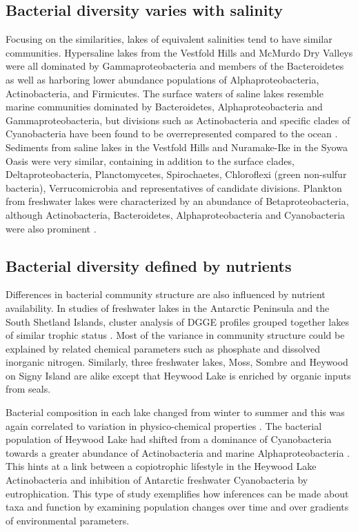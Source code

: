 \documentclass{book}
\begin{document}
\subsection{Bacterial diversity varies with salinity}
Focusing on the similarities, lakes of equivalent salinities tend to have similar communities.
Hypersaline lakes from the Vestfold Hills \cite{Bowman2000b} and McMurdo Dry Valleys \cite{Glatz2006, Mosier2007} were all dominated by Gammaproteobacteria and members of the Bacteroidetes
 as well as harboring lower abundance populations of Alphaproteobacteria, Actinobacteria, and Firmicutes.
The surface waters of saline lakes resemble marine communities dominated by Bacteroidetes, Alphaproteobacteria and Gammaproteobacteria,
 but divisions such as Actinobacteria and specific clades of Cyanobacteria have been found to be overrepresented compared to the ocean \cite{Lauro2011}.
Sediments from saline lakes in the Vestfold Hills \cite{Bowman2000a} and Nuramake-Ike in the Syowa Oasis \cite{Kurasawa2010} were very similar, 
containing in addition to the surface clades, Deltaproteobacteria, Planctomycetes, Spirochaetes, Chloroflexi (green non-sulfur bacteria), Verrucomicrobia and representatives of candidate divisions.
Plankton from freshwater lakes were characterized by an abundance of Betaproteobacteria, 
although Actinobacteria, Bacteroidetes, Alphaproteobacteria and Cyanobacteria were also prominent \cite{Pearce2003, Pearce2005, Pearce2005, Schiaffino2009}. 

\subsection{Bacterial diversity defined by nutrients}
Differences in bacterial community structure are also influenced by nutrient availability.
In studies of freshwater lakes in the Antarctic Peninsula and the South Shetland Islands, cluster analysis of DGGE profiles grouped together lakes of similar trophic status 
\cite{Schiaffino2009, Villaescusa2010}.
Most of the variance in community structure could be explained by related chemical parameters such as phosphate and dissolved inorganic nitrogen.
Similarly, three freshwater lakes, Moss, Sombre and Heywood on Signy Island are alike except that Heywood Lake is enriched by organic inputs from seals.

Bacterial composition in each lake changed from winter to summer and this was again correlated to variation in physico-chemical properties \cite{Pearce2005}. 
The bacterial population of Heywood Lake had shifted from a dominance of Cyanobacteria towards a greater abundance of Actinobacteria and marine Alphaproteobacteria \cite{Pearce2005}.
This hints at a link between a copiotrophic lifestyle in the Heywood Lake Actinobacteria and inhibition of Antarctic freshwater Cyanobacteria by eutrophication. 
This type of study exemplifies how inferences can be made about taxa and function by examining population changes over time and over gradients of environmental parameters.
\end{document}
